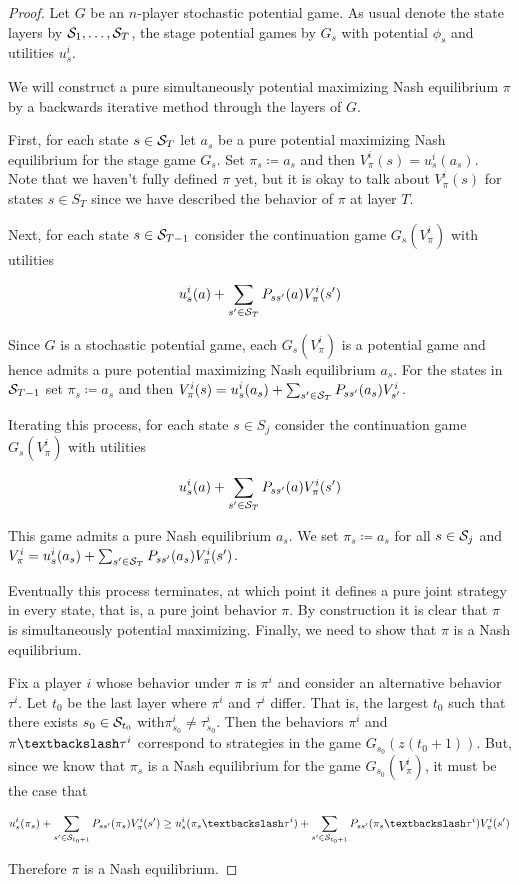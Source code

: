 \begin{proof}
Let $G$ be an $n$-player stochastic potential game. As usual denote the state layers by $\mathcal{S}_1, \ldots, \mathcal{S}_T$, the stage potential games by $G_s$ with potential $\phi_s$ and utilities $u^i_s$.

We will construct a pure simultaneously potential maximizing Nash equilibrium $\pi$ by a backwards iterative method through the layers of $G$.

First, for each state $s \in \mathcal{S}_T$ let $a_s$ be a pure potential maximizing Nash equilibrium for the stage game $G_s$. Set $\pi_s \coloneq a_s$ and then $V^i_{\pi}(s) = u^i_s(a_s)$. Note that we haven't fully defined $\pi$ yet, but it is okay to talk about $V^i_{\pi}(s)$ for states $s \in S_T$ since we have described the behavior of $\pi$ at layer $T$.

Next, for each state $s \in \mathcal{S}_{T-1}$ consider the continuation game $G_s(V^i_{\pi})$ with utilities

$$
u^i_s(a) + \sum_{s' \in \mathcal{S}_{T}}P_{ss'}(a)V^i_{\pi}(s')
$$

Since $G$ is a stochastic potential game, each $G_s(V^i_{\pi})$ is a potential game and hence admits a pure potential maximizing Nash equilibrium $a_s$. For the states in $\mathcal{S}_{T-1}$ set $\pi_s \coloneq a_s$ and then $V^i_{\pi}(s) = u^i_s(a_s) + \sum_{s' \in \mathcal{S}_T}P_{ss'}(a_s)V^i_{s'}$.

Iterating this process, for each state $s \in S_j$ consider the continuation game $G_s(V^i_{\pi})$ with utilities

$$
u^i_s(a) + \sum_{s' \in \mathcal{S}_{T}}P_{ss'}(a)V^i_{\pi}(s')
$$

This game admits a pure Nash equilibrium $a_s$. We set $\pi_s \coloneq a_s$ for all $s \in \mathcal{S}_j$ and $V^i_{\pi} = u^i_s(a_s) + \sum_{s' \in \mathcal{S}_T}P_{ss'}(a_s)V^i_{\pi}(s')$. 


Eventually this process terminates, at which point it defines a pure joint strategy in every state, that is, a pure joint behavior $\pi$. By construction it is clear that $\pi$ is simultaneously potential maximizing. Finally, we need to show that $\pi$ is a Nash equilibrium.

Fix a player $i$ whose behavior under $\pi$ is $\pi^i$ and consider an alternative behavior $\tau^i$. Let $t_0$ be the last layer where $\pi^i$ and $\tau^i$ differ. That is, the largest $t_0$ such that there exists $s_0 \in \mathcal{S}_{t_0}$ with$\pi^i_{s_0} \neq \tau^i_{s_0}$. Then the behaviors $\pi^i$ and $\asub{\pi}{\tau^i}$ correspond to strategies in the game $G_{s_0}(z(t_0+1))$. But, since we know that $\pi_s$ is a Nash equilibrium for the game $G_{s_0}(V^i_{\pi})$, it must be the case that

$$
u^i_s(\pi_s) + \sum_{s' \in \SS_{t_0+1}} P_{ss'}(\pi_s)V^i_{\pi}(s') \geq u^i_s(\asub{\pi_s}{\tau^i}) + \sum_{s' \in \SS_{t_0+1}} P_{ss'}(\asub{\pi_s}{\tau^i})V^i_{\pi}(s')
$$

Therefore $\pi$ is a Nash equilibrium.


\end{proof}

